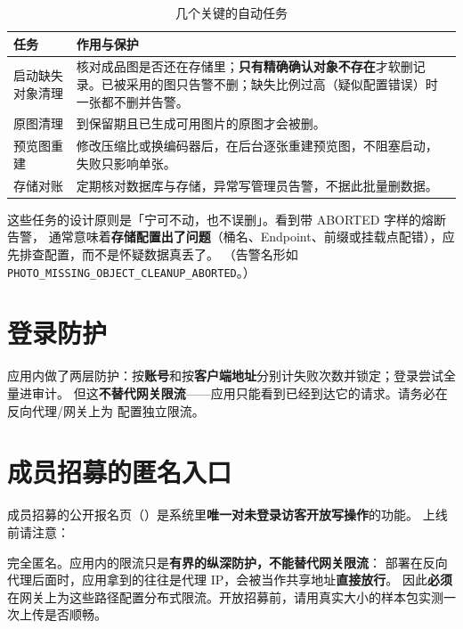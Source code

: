\documentclass[cn,11pt,green]{elegantbook}
\begin{document}
\begin{table}[htbp]
  \centering
  \caption{几个关键的自动任务}
  \begin{tabular}{L{4.6cm} L{7.8cm}}
    \toprule
    \textbf{任务} & \textbf{作用与保护} \\
    \midrule
    启动缺失对象清理 & 核对成品图是否还在存储里；\textbf{只有精确确认对象不存在}才软删记录。已被采用的图只告警不删；缺失比例过高（疑似配置错误）时一张都不删并告警。 \\
    原图清理 & 到保留期且已生成可用图片的原图才会被删。 \\
    预览图重建 & 修改压缩比或换编码器后，在后台逐张重建预览图，不阻塞启动，失败只影响单张。 \\
    存储对账 & 定期核对数据库与存储，异常写管理员告警，不据此批量删数据。 \\
    \bottomrule
  \end{tabular}
\end{table}

\begin{tipbox}[看到告警不要慌]
  这些任务的设计原则是「宁可不动，也不误删」。看到带 ABORTED 字样的熔断告警，
  通常意味着\textbf{存储配置出了问题}（桶名、Endpoint、前缀或挂载点配错），应先排查配置，而不是怀疑数据真丢了。
  （告警名形如 \texttt{PHOTO\_MISSING\_OBJECT\_CLEANUP\_ABORTED}。）
\end{tipbox}

\section{登录防护}

应用内做了两层防护：按\textbf{账号}和按\textbf{客户端地址}分别计失败次数并锁定；登录尝试全量进审计。
但这\textbf{不替代网关限流}——应用只能看到已经到达它的请求。请务必在反向代理/网关上为 
配置独立限流。

\section{成员招募的匿名入口}

成员招募的公开报名页（）是系统里\textbf{唯一对未登录访客开放写操作}的功能。
上线前请注意：

\begin{warnbox}[网关必须承担的防护]
   完全匿名。应用内的限流只是\textbf{有界的纵深防护，不能替代网关限流}：
  部署在反向代理后面时，应用拿到的往往是代理 IP，会被当作共享地址\textbf{直接放行}。
  因此\textbf{必须}在网关上为这些路径配置分布式限流。开放招募前，请用真实大小的样本包实测一次上传是否顺畅。
\end{warnbox}
\end{document}
